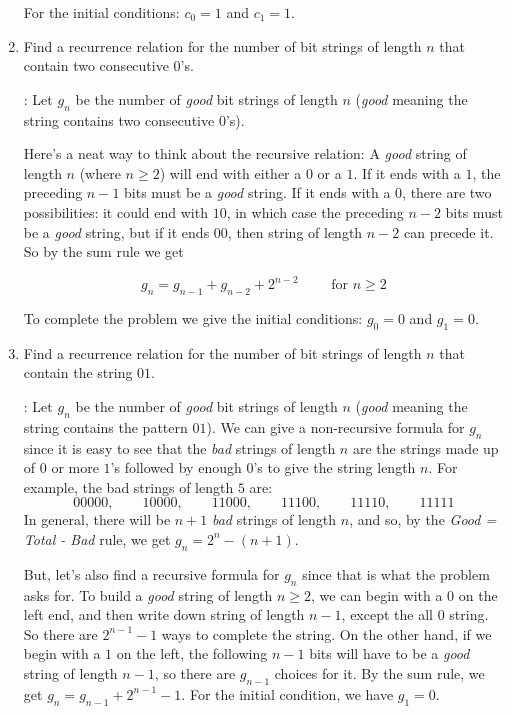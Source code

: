 \documentclass[11pt]{amsart}
\begin{document}
\begin{enumerate}
For the initial conditions: $c_0=1$ and $c_1=1$. 
 
\medskip

\item Find a recurrence relation for the number of bit strings of length $n$ that contain
two consecutive $0$'s.
\medskip

: Let $g_n$ be the number of {\it good} bit strings of length $n$ ({\it good} meaning
the string contains two consecutive $0$'s). 

Here's a neat way to think about the recursive relation: A {\it good} string 
of length $n$ (where $n\geq2$) will end with either a $0$ or a $1$. If it ends with a $1$, the
preceding $n-1$ bits must be a {\it good} string. If it ends with a $0$, there are two possibilities:
it could end with $10$, in which case the preceding $n-2$ bits must be a {\it good} string, but if
it ends $00$, then  string of length $n-2$ can precede it. So by the sum rule we get

$$g_n = g_{n-1} + g_{n-2} + 2^{n-2} \qquad\text{ for } n\geq2$$

To complete the problem we give the initial conditions: $g_0 = 0$ and $g_1=0$.

\medskip

\item Find a recurrence relation for the number of bit strings of length $n$ that contain
the string $01$.

: Let $g_n$ be the number of {\it good} bit strings of length $n$ ({\it good} meaning
the string contains the pattern $01$).  We can give a non-recursive formula for $g_n$ since it is easy to
see that the {\it bad} strings of length $n$ are the strings made up of $0$ or more $1$'s followed by 
enough $0$'s to give the string length $n$. For example, the bad strings of length $5$ are:
$$00000,\qquad10000,\qquad11000,\qquad11100,\qquad11110,\qquad11111$$
In general, there will be $n+1$ {\it bad} strings of length $n$, and so, by the {\it Good = Total - Bad} rule,
we get $g_n = 2^n - (n+1)$.

But, let's also find a recursive formula for $g_n$ since that is what the problem asks for.
To build a {\it good} string of length $n\geq 2$, we can begin with a $0$ on the left end, 
and then write down  string of length $n-1$, except the all $0$ string. So there
are $2^{n-1} - 1$ ways to complete the string. On the other hand, if we begin with a $1$ on the
left, the following $n-1$ bits will have to be a {\it good} string of length $n-1$, so there are
$g_{n-1}$ choices for it. By the sum rule, we get $g_n = g_{n-1}+2^{n-1}-1$. For the initial
condition, we have $g_1 = 0$. 

\end{enumerate}
\end{document}
